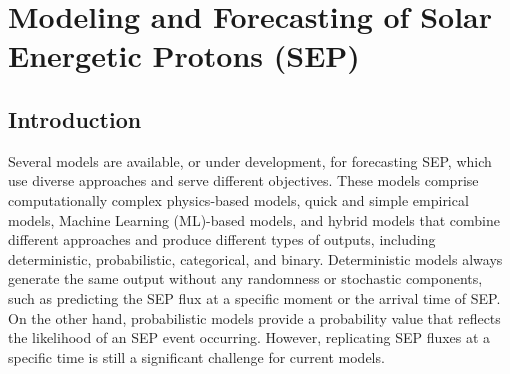 \chapter{Modeling and Forecasting of Solar Energetic Protons (SEP)}
\label{chapter4}

\section{Introduction}
\label{sec_ch4_intro}
Several models are available, or under development, for forecasting SEP, which use diverse approaches and serve different objectives. These models comprise computationally complex physics-based models, quick and simple empirical models, Machine Learning (ML)-based models, and hybrid models that combine different approaches and produce different types of outputs, including deterministic, probabilistic, categorical, and binary. Deterministic models always generate the same output without any randomness or stochastic components, such as predicting the SEP flux at a specific moment or the arrival time of SEP. On the other hand, probabilistic models provide a probability value that reflects the likelihood of an SEP event occurring. However, replicating SEP fluxes at a specific time is still a significant challenge for current models.


